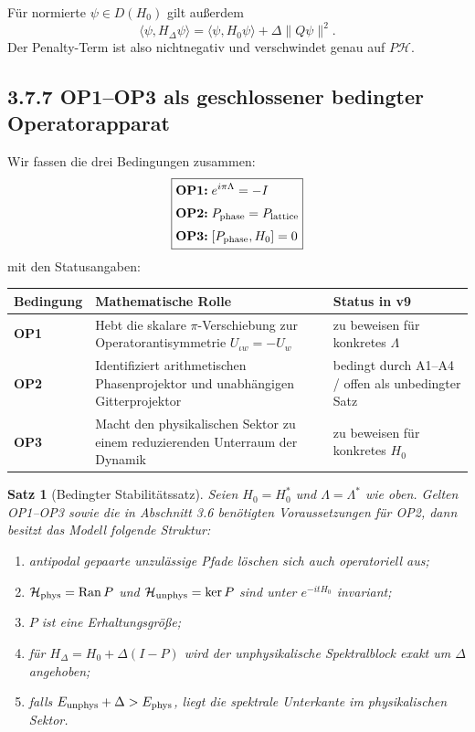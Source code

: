 \documentclass[11pt,a4paper]{article}
\newtheorem{satz}{Satz}
\begin{document}
Für normierte $\psi\in D(H_0)$ gilt außerdem
\[
\boxed{
\langle\psi,H_\Delta\psi\rangle
=
\langle\psi,H_0\psi\rangle
+\Delta\|Q\psi\|^2.}
\]
Der Penalty-Term ist also nichtnegativ und verschwindet genau auf $P\mathcal H$.

\subsection*{3.7.7 OP1--OP3 als geschlossener bedingter Operatorapparat}
Wir fassen die drei Bedingungen zusammen:
\[
\boxed{
\begin{aligned}
\textbf{OP1:}\;&e^{i\pi\Lambda}=-I
\\[1mm]
\textbf{OP2:}\;&P_{\rm phase}=P_{\rm lattice}
\\[1mm]
\textbf{OP3:}\;&[P_{\rm phase},H_0]=0
\end{aligned}}
\]
mit den Statusangaben:
\begin{center}
\begin{tabularx}{\textwidth}{>{\bfseries}l X l}
\toprule
Bedingung & Mathematische Rolle & Status in v9\\
\midrule
OP1 & Hebt die skalare $\pi$-Verschiebung zur Operatorantisymmetrie $U_{\iota w}=-U_w$ & zu beweisen für konkretes $\Lambda$\\
OP2 & Identifiziert arithmetischen Phasenprojektor und unabhängigen Gitterprojektor & bedingt durch A1--A4 / offen als unbedingter Satz\\
OP3 & Macht den physikalischen Sektor zu einem reduzierenden Unterraum der Dynamik & zu beweisen für konkretes $H_0$\\
\bottomrule
\end{tabularx}
\end{center}

\begin{satz}[Bedingter Stabilitätssatz]
Seien $H_0=H_0^*$ und $\Lambda=\Lambda^*$ wie oben. Gelten OP1--OP3 sowie die in Abschnitt 3.6 benötigten Voraussetzungen für OP2, dann besitzt das Modell folgende Struktur:
\begin{enumerate}[leftmargin=1.6em]
\item antipodal gepaarte unzulässige Pfade löschen sich auch operatoriell aus;
\item $\mathcal H_{\rm phys}=\operatorname{Ran}P$ und $\mathcal H_{\rm unphys}=\ker P$ sind unter $e^{-itH_0}$ invariant;
\item $P$ ist eine Erhaltungsgröße;
\item für $H_\Delta=H_0+\Delta(I-P)$ wird der unphysikalische Spektralblock exakt um $\Delta$ angehoben;
\item falls $E_{\rm unphys}+\Delta>E_{\rm phys}$, liegt die spektrale Unterkante im physikalischen Sektor.
\end{enumerate}
\end{satz}
\end{document}
